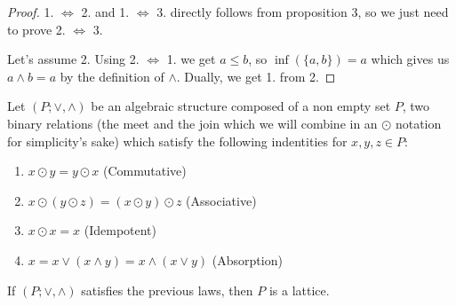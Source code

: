 \begin{proof} 1. $\Leftrightarrow$ 2. and 1. $\Leftrightarrow$ 3. directly
follows from proposition 3, so we just need to prove 2. $\Leftrightarrow$ 3.

  Let's assume 2. Using 2. $\Leftrightarrow$ 1. we get $a \leq b$, so
$\inf(\{a,b\}) = a$ which gives us $a \land b = a$ by the definition of
$\land$. Dually, we get 1. from 2.
\end{proof}

\begin{theorem} Let $(P;\lor,\land)$ be an algebraic structure composed of a non
empty set $P$, two binary relations (the meet and the join which we will combine
in an $\odot$ notation for simplicity's sake) which satisfy the following
indentities for $x, y, z \in P$:
 	\begin{enumerate}
 		\item $x \odot y = y \odot x$ (Commutative)
 		\item $x \odot (y \odot z) = (x \odot y) \odot z$ (Associative)
 		\item $x \odot x = x$ (Idempotent)
 		\item $x = x \lor (x \land y) = x \land (x \lor y)$ (Absorption)
 	\end{enumerate}

	If $(P;\lor,\land)$ satisfies the previous laws, then $P$ is a lattice.
\end{theorem}

